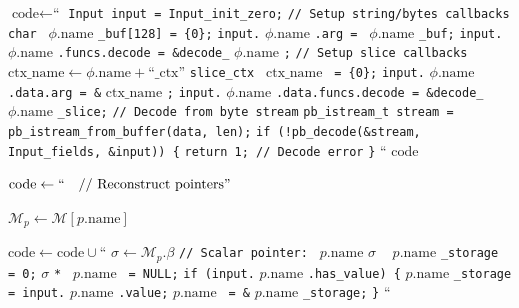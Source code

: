 \begin{algorithm}[H]
\begin{algorithmic}[1]
    \STATE $\text{code} \leftarrow \text{``}$
    \STATE \quad \texttt{Input input = Input\_init\_zero;}
    \STATE \quad
    \STATE \quad \texttt{// Setup string/bytes callbacks}
        \STATE \quad \texttt{char } $\phi.\text{name}$ \texttt{\_buf[128] = \{0\};}
        \STATE \quad \texttt{input.} $\phi.\text{name}$ \texttt{.arg = } $\phi.\text{name}$ \texttt{\_buf;}
        \STATE \quad \texttt{input.} $\phi.\text{name}$ \texttt{.funcs.decode = \&decode\_} $\phi.\text{name}$ \texttt{;}
    \ENDFOR
    \STATE \quad
    \STATE \quad \texttt{// Setup slice callbacks}
        \STATE \quad $\text{ctx\_name} \leftarrow \phi.\text{name} + \text{``\_ctx''}$
        \STATE \quad \texttt{slice\_ctx } $\text{ctx\_name}$ \texttt{ = \{0\};}
        \STATE \quad \texttt{input.} $\phi.\text{name}$ \texttt{.data.arg = \&} $\text{ctx\_name}$ \texttt{;}
        \STATE \quad \texttt{input.} $\phi.\text{name}$ \texttt{.data.funcs.decode = \&decode\_} $\phi.\text{name}$ \texttt{\_slice;}
    \ENDFOR
    \STATE \quad
    \STATE \quad \texttt{// Decode from byte stream}
    \STATE \quad \texttt{pb\_istream\_t stream = pb\_istream\_from\_buffer(data, len);}
    \STATE \quad \texttt{if (!pb\_decode(\&stream, Input\_fields, \&input)) \{}
    \STATE \quad \quad \texttt{return 1; // Decode error}
    \STATE \quad \texttt{\}}
    \STATE $\text{``}$
    \RETURN $\text{code}$
\ENDPROCEDURE

\vspace{0.3cm}

    \STATE $\text{code} \leftarrow \text{``\quad // Reconstruct pointers''}$

            \STATE $\mathcal{M}_p \leftarrow \mathcal{M}[p.\text{name}]$

                \STATE $\text{code} \leftarrow \text{code} \cup \text{``}$
                \STATE \quad $\sigma \leftarrow \mathcal{M}_p.\beta$ 
                \STATE \quad \texttt{// Scalar pointer: } $p.\text{name}$
                \STATE \quad $\sigma$ \texttt{ } $p.\text{name}$ \texttt{\_storage = 0;}
                \STATE \quad $\sigma$ \texttt{* } $p.\text{name}$ \texttt{ = NULL;}
                \STATE \quad \texttt{if (input.} $p.\text{name}$ \texttt{.has\_value) \{}
                \STATE \quad \quad $p.\text{name}$ \texttt{\_storage = input.} $p.\text{name}$ \texttt{.value;}
                \STATE \quad \quad $p.\text{name}$ \texttt{ = \&} $p.\text{name}$ \texttt{\_storage;}
                \STATE \quad \texttt{\}}
                \STATE $\text{``}$


\end{algorithmic}
\end{algorithm}
